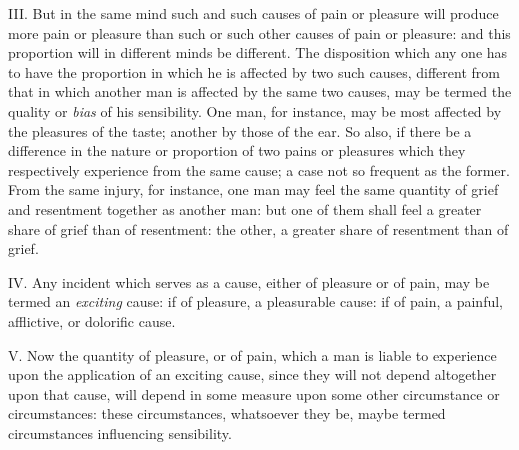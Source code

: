 \documentclass[12pt]{report}
\begin{document}
III. But in the same mind such and such causes of pain or pleasure will
produce more pain or pleasure than such or such other causes of pain or
pleasure: and this proportion will in different minds be different. The
disposition which any one has to have the proportion in which he is
affected by two such causes, different from that in which another man is
affected by the same two causes, may be termed the quality or
\emph{bias} of his sensibility. One man, for instance, may be most
affected by the pleasures of the taste; another by those of the ear. So
also, if there be a difference in the nature or proportion of two pains
or pleasures which they respectively experience from the same cause; a
case not so frequent as the former. From the same injury, for instance,
one man may feel the same quantity of grief and resentment together as
another man: but one of them shall feel a greater share of grief than of
resentment: the other, a greater share of resentment than of grief.

IV. Any incident which serves as a cause, either of pleasure or of pain,
may be termed an \emph{exciting} cause: if of pleasure, a pleasurable
cause: if of pain, a painful, afflictive, or dolorific cause.

V. Now the quantity of pleasure, or of pain, which a man is liable to
experience upon the application of an exciting cause, since they will
not depend altogether upon that cause, will depend in some measure upon
some other circumstance or circumstances: these circumstances,
whatsoever they be, maybe termed circumstances influencing sensibility.
\end{document}
